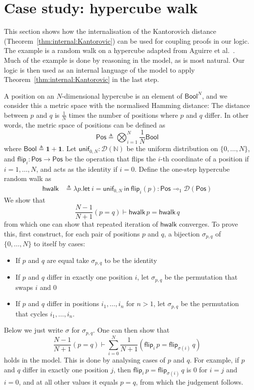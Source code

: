 \documentclass[a4paper,UKenglish,cleveref, autoref, thm-restate]{lipics-v2021}
\newcommand{\lol}{\mathbin{\multimap}}
\newcommand{\unit}{\mathbf{1}}
\newcommand{\nat}{\mathbb{N}}
\newcommand{\bool}{\mathsf{Bool}}
\newcommand{\ts}{\vdash}
\newcommand{\Pos}{\mathsf{Pos}}
\newcommand{\flip}{\mathsf{flip}}
\newcommand{\unifZN}{\mathsf{unif}_{0,N}}
\newcommand{\hwalk}{\mathsf{hwalk}}
\newcommand{\bijarg}[2]{\sigma_{#1,#2}}
\newcommand{\bij}{\sigma}
\newcommand{\letIn}[2]{\mathsf{let~} #1 \mathsf{~in~} #2}
\newcommand{\TD}{\mathcal{D}}
\newcommand{\peq}{=}
\newcommand{\defeq}{\triangleq}
\begin{document}
\section{Case study: hypercube walk}
\label{sec:hypercube}

This section shows how the internalisation of the Kantorovich distance (Theorem~\ref{thm:internal:Kantorovic})
can be used for coupling proofs in our logic. The example is a random walk on a hypercube adapted from
Aguirre et al.~\cite{BHKKM21}. Much of the example is done by reasoning in the model, as is most natural. 
Our logic is then used as an internal language of the model to apply Theorem~\ref{thm:internal:Kantorovic}
in the last step. 


A position on an $N$-dimensional hypercube is an element of $\bool^N$, and we consider this a metric space with the 
normalised Hamming distance: The distance between $p$ and $q$ is $\frac 1N$ times the number of positions where $p$ 
and $q$ differ. In other words, the metric space of positions can be defined as 
\[
  \Pos \defeq \bigotimes_{i=1}^N\frac1N\bool
\]
where $\bool \defeq \unit + \unit$. 
Let $\unifZN : \TD(\nat)$ be the uniform distribution on $\{0,\dots, N\}$, 
and $\flip_i : \Pos \to \Pos$ be the operation that flips the $i$-th 
coordinate of a position if $i = 1,\dots, N$, and acts as the identity if $i=0$. Define the one-step hypercube random walk
as
\begin{align*}
 \hwalk & \defeq \lambda p.  \letIn{i = \unifZN}{\flip_i(p)}  : \Pos \lol_1 \TD(\Pos)
\end{align*}
We show that
\begin{equation} \label{eq:hyper:cube:goal}
 \frac{N-1}{N+1}(p \peq q) \ts \hwalk\, p \peq \hwalk\,q
\end{equation}
from which one can show that repeated iteration of $\hwalk$ converges.
To prove this, first construct, for each pair of positions
$p$ and $q$, a bijection $\bijarg pq$ of $\{0,\dots, N\}$ to itself by cases:
\begin{itemize}
\item If $p$ and $q$ are equal take $\bijarg pq$ to be the identity
\item If $p$ and $q$ differ in exactly one position $i$, let $\bijarg pq$ be the permutation
that swaps $i$ and $0$
\item If $p$ and $q$ differ in positions $i_1,\dots, i_n$ for $n>1$, let $\bijarg pq$ be the permutation
that cycles $i_1,\dots, i_n$. 
\end{itemize}
Below we just write $\bij$ for $\bijarg pq$.
One can then show that 
\begin{equation} \label{eq:sum:flip}
\frac{N-1}{N+1}(p\peq q) \ts \sum_{i=0}^N\frac1{N+1}(\flip_i\,p \peq \flip_{\bij(i)}\,q)
\end{equation}
holds in the model. This is done by analysing cases of $p$ and $q$. For example, if $p$ and $q$ differ in
exactly one position $j$, then $\flip_i\,p \peq \flip_{\bij(i)}\,q$ is $0$ for $i=j$ and $i=0$, and at all 
other values it equals $p\peq q$, from which the judgement follows.  
\end{document}
